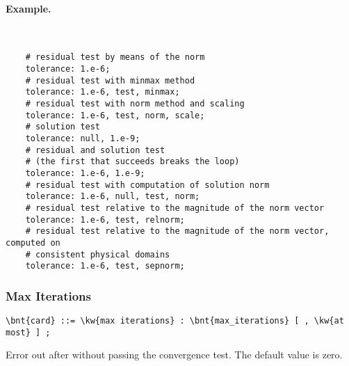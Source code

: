 \paragraph{Example.} \
\begin{verbatim}
    # residual test by means of the norm
    tolerance: 1.e-6;
    # residual test with minmax method
    tolerance: 1.e-6, test, minmax;
    # residual test with norm method and scaling
    tolerance: 1.e-6, test, norm, scale;
    # solution test
    tolerance: null, 1.e-9;
    # residual and solution test
    # (the first that succeeds breaks the loop)
    tolerance: 1.e-6, 1.e-9;
    # residual test with computation of solution norm
    tolerance: 1.e-6, null, test, norm;
    # residual test relative to the magnitude of the norm vector
    tolerance: 1.e-6, test, relnorm;
    # residual test relative to the magnitude of the norm vector, computed on
    # consistent physical domains
    tolerance: 1.e-6, test, sepnorm;
\end{verbatim}

\subsubsection{Max Iterations}
\begin{Verbatim}[commandchars=\\\{\}]
    \bnt{card} ::= \kw{max iterations} : \bnt{max_iterations} [ , \kw{at most} ] ;
\end{Verbatim}
Error out after  without passing the convergence test.
The default value is zero.

